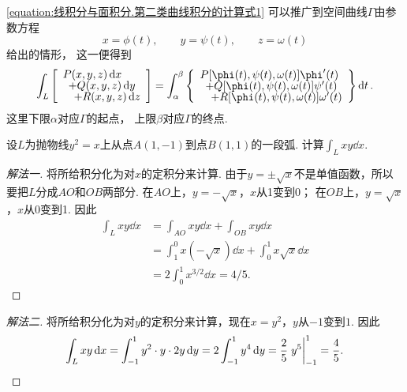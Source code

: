 \cref{equation:线积分与面积分.第二类曲线积分的计算式1} 可以推广到空间曲线\(\Gamma\)由参数方程\[
	x=\phi(t), \qquad
	y=\psi(t), \qquad
	z=\omega(t)
\]给出的情形，
这一便得到
\begin{equation}\label{equation:线积分与面积分.第二类曲线积分的计算式2}
	\int_L \left[ \def\arraystretch{.7}\begin{array}{l}
		P(x,y,z)\dd{x} \\
		\hspace{5pt}+ Q(x,y,z)\dd{y} \\
		\hspace{10pt}+ R(x,y,z)\dd{z}
	\end{array} \right]
	= \int_\alpha^\beta \left\{\def\arraystretch{.7}\begin{array}{l}
	P[\phi(t),\psi(t),\omega(t)] \phi'(t) \\
	\hspace{5pt}+ Q[\phi(t),\psi(t),\omega(t)] \psi'(t) \\
	\hspace{10pt}+ R[\phi(t),\psi(t),\omega(t)] \omega'(t)
	\end{array} \right\} \dd{t}.
\end{equation}
这里下限\(\alpha\)对应\(\Gamma\)的起点，
上限\(\beta\)对应\(\Gamma\)的终点.

\begin{example}
设\(L\)为抛物线\(y^2 = x\)上从点\(A(1,-1)\)到点\(B(1,1)\)的一段弧.
计算\(\int_L xy \dd{x}\).
\begin{solution}\let\qed\relax
\begin{proof}[解法一]
将所给积分化为对\(x\)的定积分来计算.
由于\(y = \pm\sqrt{x}\)不是单值函数，所以要把\(L\)分成\(AO\)和\(OB\)两部分.
在\(AO\)上，\(y=-\sqrt{x}\)，\(x\)从1变到0；
在\(OB\)上，\(y=\sqrt{x}\)，\(x\)从0变到1.
因此\begin{align*}
	\int_L xy \dd{x} &= \int_{AO} xy \dd{x} + \int_{OB} xy \dd{x} \\
	&= \int_1^0 x(-\sqrt{x}) \dd{x} + \int_0^1 x\sqrt{x} \dd{x} \\
	&= 2\int_0^1 x^{3/2} \dd{x} = 4/5.
\end{align*}
\end{proof}
\begin{proof}[解法二]
将所给积分化为对\(y\)的定积分来计算，现在\(x=y^2\)，\(y\)从\(-1\)变到\(1\).
因此\[
	\int_L xy \dd{x}
	= \int_{-1}^1 y^2 \cdot y \cdot 2y \dd{y}
	= 2\int_{-1}^1 y^4 \dd{y}
	= \frac{2}{5} \eval{y^5}_{-1}^1
	= \frac{4}{5}.
\]
\end{proof}
\end{solution}
\end{example}

